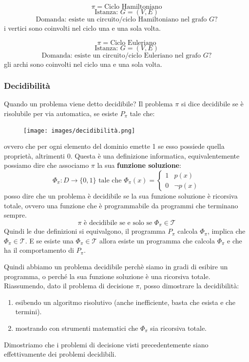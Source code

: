\documentclass{article}
\begin{document}
$$\pi=\text{Ciclo Hamiltoniano}$$
$$\text{Istanza: }G=(V,E)$$
$$\text{Domanda: esiste un circuito/ciclo Hamiltoniano nel grafo }G?$$
i vertici sono coinvolti nel ciclo una e una sola volta.

$$\pi=\text{Ciclo Euleriano}$$
$$\text{Istanza: }G=(V,E)$$
$$\text{Domanda: esiste un circuito/ciclo Euleriano nel grafo }G?$$
gli archi sono coinvolti nel ciclo una e una sola volta.

\subsubsection{Decidibilità}
Quando un problema viene detto decidibile? Il problema $\pi$ si dice decidibile se è risolubile
per via automatica, se esiste $P_\pi$ tale che:
\begin{figure}[H]
    \centering
    \texttt{[image: images/decidibilità.png]}
\end{figure}
ovvero che per ogni elemento del dominio emette 1 se esso possiede quella proprietà, altrimenti 0.
Questa è una definizione informatica, equivalentemente possiamo dire che associamo
$\pi$ la sua \textbf{funzione soluzione}:
\[
    \Phi_\pi:D\rightarrow\{0,1\}\text{ tale che }\Phi_\pi(x)=
    \begin{cases}
        1 & p(x)       \\
        0 & \lnot p(x)
    \end{cases}
\]
posso dire che un problema è decidibile se la sua funzione soluzione è ricorsiva totale,
ovvero una funzione che è programmabile da programmi che terminano sempre.
$$\pi\text{ è decidibile se e solo se }\Phi_\pi\in\mathcal{T}$$
Quindi le due definizioni si equivalgono, il programma $P_\pi$ calcola $\Phi_\pi$, implica
che $\Phi_\pi\in\mathcal{T}$. E se esiste una $\Phi_\pi\in\mathcal{T}$ allora esiste un
programma che calcola $\Phi_\pi$ e che ha il comportamento di $P_\pi$.

Quindi abbiamo un problema decidibile perchè siamo in gradi di esibire un programma, o perché
la sua funzione soluzione è una ricorsiva totale. Riassumendo, dato il problema di decisione
$\pi$, posso dimostrare la decidibilità:
\begin{enumerate}
    \item esibendo un algoritmo risolutivo (anche inefficiente, basta che esista e che termini).
    \item mostrando con strumenti matematici che $\Phi_\pi$ sia ricorsiva totale.
\end{enumerate}
Dimostriamo che i problemi di decisione visti precedentemente siano effettivamente
dei problemi decidibili.
\end{document}
